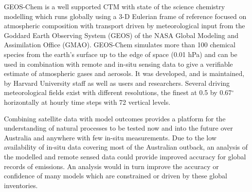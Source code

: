 GEOS-Chem is a well supported CTM with state of the science chemistry modelling which runs globally using a 3-D Eulerian frame of reference focused on atmospheric composition with transport driven by meteorological input from the Goddard Earth Observing System (GEOS) of the NASA Global Modeling and Assimilation Office (GMAO).
GEOS-Chem simulates more than 100 chemical species from the earth's surface up to the edge of space (0.01 hPa) and can be used in combination with remote and in-situ sensing data to give a verifiable estimate of atmospheric gases and aerosols.
It was developed, and is maintained, by Harvard University staff as well as users and researchers. 
Several driving meteorological fields exist with different resolutions, the finest at 0.5 by 0.67$^\circ$ horizontally at hourly time steps with 72 vertical levels.


Combining satellite data with model outcomes provides a platform for the understanding of natural processes to be tested now and into the future over Australia and anywhere with few in-situ measurements.
Due to the low availability of in-situ data covering most of the Australian outback, an analysis of the modelled and remote sensed data could provide improved accuracy for global records of emissions.
An analysis would in turn improve the accuracy or confidence of many models which are constrained or driven by these global inventories.
